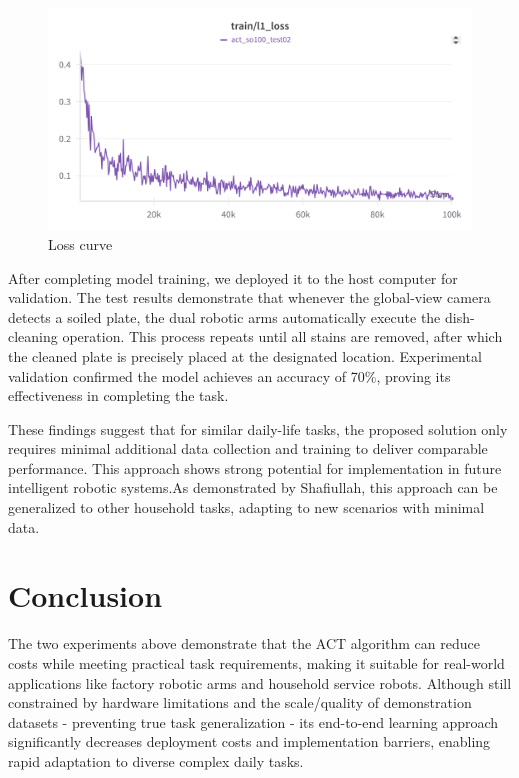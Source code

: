 \documentclass[runningheads]{llncs}
\begin{document}
\begin{figure}[H]
\centering
\includegraphics[width=323pt]{20}
\caption{Loss curve} \label{fig19}
\end{figure}


After completing model training, we deployed it to the host computer for validation. The test results demonstrate that whenever the global-view camera detects a soiled plate, the dual robotic arms automatically execute the dish-cleaning operation. This process repeats until all stains are removed, after which the cleaned plate is precisely placed at the designated location. Experimental validation confirmed the model achieves an accuracy of 70\%, proving its effectiveness in completing the task.

These findings suggest that for similar daily-life tasks, the proposed solution only requires minimal additional data collection and training to deliver comparable performance. This approach shows strong potential for implementation in future intelligent robotic systems.As demonstrated by Shafiullah\cite{ref17}, this approach can be generalized to other household tasks, adapting to new scenarios with minimal data.


\section{Conclusion}
The two experiments above demonstrate that the ACT algorithm can reduce costs while meeting practical task requirements, making it suitable for real-world applications like factory robotic arms and household service robots. Although still constrained by hardware limitations and the scale/quality of demonstration datasets - preventing true task generalization - its end-to-end learning approach significantly decreases deployment costs and implementation barriers, enabling rapid adaptation to diverse complex daily tasks.

\end{document}
